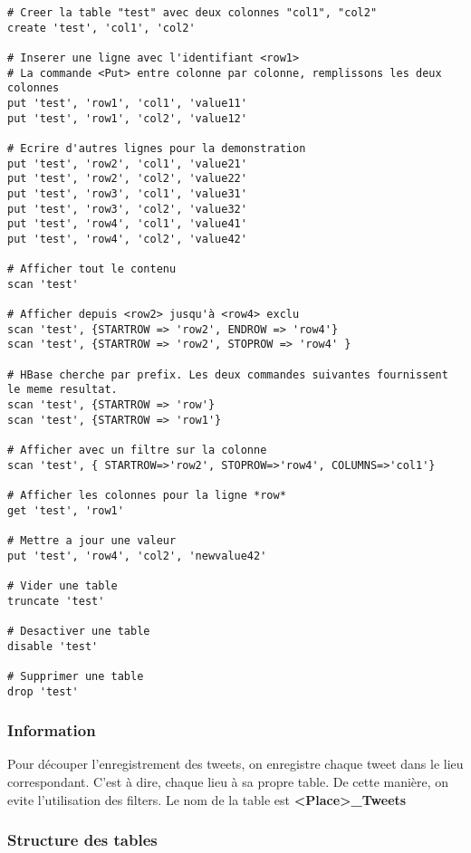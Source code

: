 \documentclass[a4paper,oneside,12pt]{article}
\begin{document}
\begin{verbatim}
# Creer la table "test" avec deux colonnes "col1", "col2" 
create 'test', 'col1', 'col2'

# Inserer une ligne avec l'identifiant <row1>
# La commande <Put> entre colonne par colonne, remplissons les deux colonnes
put 'test', 'row1', 'col1', 'value11'
put 'test', 'row1', 'col2', 'value12'

# Ecrire d'autres lignes pour la demonstration
put 'test', 'row2', 'col1', 'value21'
put 'test', 'row2', 'col2', 'value22'
put 'test', 'row3', 'col1', 'value31'
put 'test', 'row3', 'col2', 'value32'
put 'test', 'row4', 'col1', 'value41'
put 'test', 'row4', 'col2', 'value42'

# Afficher tout le contenu
scan 'test'

# Afficher depuis <row2> jusqu'à <row4> exclu
scan 'test', {STARTROW => 'row2', ENDROW => 'row4'}
scan 'test', {STARTROW => 'row2', STOPROW => 'row4' }

# HBase cherche par prefix. Les deux commandes suivantes fournissent le meme resultat.
scan 'test', {STARTROW => 'row'}
scan 'test', {STARTROW => 'row1'}

# Afficher avec un filtre sur la colonne
scan 'test', { STARTROW=>'row2', STOPROW=>'row4', COLUMNS=>'col1'}

# Afficher les colonnes pour la ligne *row*
get 'test', 'row1'

# Mettre a jour une valeur
put 'test', 'row4', 'col2', 'newvalue42'

# Vider une table
truncate 'test'

# Desactiver une table
disable 'test'

# Supprimer une table
drop 'test'

\end{verbatim}


\subsubsection{Information}

Pour découper l'enregistrement des tweets, on enregistre chaque tweet dans le lieu correspondant. C'est à dire, chaque lieu à sa propre table. De cette manière, on evite l'utilisation des filters. Le nom de la table est \textbf{<Place>\_Tweets}

\subsubsection{Structure des tables}
\end{document}
